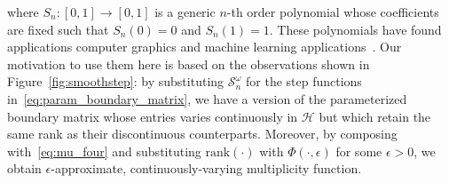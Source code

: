 \documentclass[10pt]{article}
\numberwithin{equation}{section}
\newcommand{\+}{%
	\raisebox{0.18ex}{\scaleobj{0.55}{+}}
}
\newtheorem{definition}{Definition}
\theoremstyle{definition}
\begin{document}
where $S_n: [0,1] \to [0,1]$ is a generic $n$-th order polynomial whose coefficients are fixed such that $S_n(0) = 0$ and $S_n(1) = 1$.
These polynomials have found applications computer graphics and machine learning applications~\cite{}. 
Our motivation to use them here is based on the observations shown in Figure~\ref{fig:smoothstep}: by substituting $\mathcal{S}_n^{\omega}$ for the step functions 	in~\eqref{eq:param_boundary_matrix}, we have a version of the parameterized boundary matrix whose entries varies continuously in $\mathcal{H}$ but which retain the same rank as their discontinuous counterparts. 
Moreover, by composing with~\eqref{eq:mu_four} and substituting $\mathrm{rank}(\cdot)$ with $\Phi(\cdot, \epsilon)$ for some $\epsilon > 0$, we obtain $\epsilon$-approximate, continuously-varying multiplicity function. 
\end{document}
